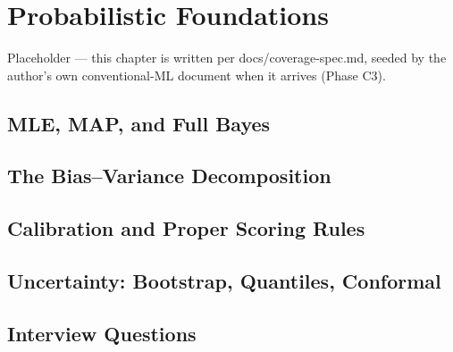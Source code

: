 \chapter{Probabilistic Foundations}
\label{cml:chap:probabilistic_foundations}

\begin{tldr}
Placeholder — this chapter is written per docs/coverage-spec.md, seeded by the author's own conventional-ML document when it arrives (Phase C3).
\end{tldr}

\section{MLE, MAP, and Full Bayes}

\section{The Bias--Variance Decomposition}

\section{Calibration and Proper Scoring Rules}

\section{Uncertainty: Bootstrap, Quantiles, Conformal}

\section{Interview Questions}

